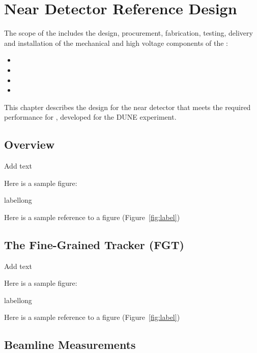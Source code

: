 \chapter{Near Detector Reference Design}
\label{ch:detectors-nd-ref}

The scope of the \fixme{} includes the design, procurement, fabrication, testing, delivery and installation of the mechanical and high voltage components of the \fixme{}: 
\begin{itemize}
\item  
\item 
\item 
\item 
\end{itemize}
This chapter describes the design for the near detector that meets the required performance for \fixme{}, developed for the DUNE experiment.

\section{Overview}
\label{sec:detectors-nd-ref-ov}

Add text

Here is a sample figure: 

\begin{cdrfigure}[short]{label}{long}
\end{cdrfigure}


Here is a sample reference to a figure (Figure~\ref{fig:label})


\section{The Fine-Grained Tracker (FGT)} 
\label{sec:detectors-nd-ref-fgt}

Add text

Here is a sample figure: 

\begin{cdrfigure}[short]{label}{long}
\end{cdrfigure}


Here is a sample reference to a figure (Figure~\ref{fig:label})

\section{Beamline Measurements} 
\label{sec:detectors-nd-ref-blm}


